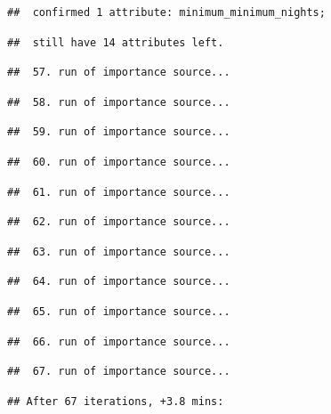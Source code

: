 \documentclass[
]{article}
\begin{document}
\begin{verbatim}
##  confirmed 1 attribute: minimum_minimum_nights;
\end{verbatim}

\begin{verbatim}
##  still have 14 attributes left.
\end{verbatim}

\begin{verbatim}
##  57. run of importance source...
\end{verbatim}

\begin{verbatim}
##  58. run of importance source...
\end{verbatim}

\begin{verbatim}
##  59. run of importance source...
\end{verbatim}

\begin{verbatim}
##  60. run of importance source...
\end{verbatim}

\begin{verbatim}
##  61. run of importance source...
\end{verbatim}

\begin{verbatim}
##  62. run of importance source...
\end{verbatim}

\begin{verbatim}
##  63. run of importance source...
\end{verbatim}

\begin{verbatim}
##  64. run of importance source...
\end{verbatim}

\begin{verbatim}
##  65. run of importance source...
\end{verbatim}

\begin{verbatim}
##  66. run of importance source...
\end{verbatim}

\begin{verbatim}
##  67. run of importance source...
\end{verbatim}

\begin{verbatim}
## After 67 iterations, +3.8 mins:
\end{verbatim}
\end{document}
